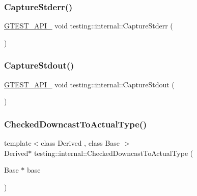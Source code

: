 \mbox{\label{namespacetesting_1_1internal_a8ec00d458d0d442bd64af7b5f9c22dda}} 
\subsubsection{\texorpdfstring{Capture\+Stderr()}{CaptureStderr()}}
{\footnotesize\ttfamily \hyperlink{gtest-port_8h_aa73be6f0ba4a7456180a94904ce17790}{G\+T\+E\+S\+T\+\_\+\+A\+P\+I\+\_\+} void testing\+::internal\+::\+Capture\+Stderr (\begin{DoxyParamCaption}{ }\end{DoxyParamCaption})}

\mbox{\label{namespacetesting_1_1internal_acba06d4f0343dec407738ba5544af990}} 
\subsubsection{\texorpdfstring{Capture\+Stdout()}{CaptureStdout()}}
{\footnotesize\ttfamily \hyperlink{gtest-port_8h_aa73be6f0ba4a7456180a94904ce17790}{G\+T\+E\+S\+T\+\_\+\+A\+P\+I\+\_\+} void testing\+::internal\+::\+Capture\+Stdout (\begin{DoxyParamCaption}{ }\end{DoxyParamCaption})}

\mbox{\label{namespacetesting_1_1internal_abfe9bfb020d38aa4e0e12c001911b22b}} 
\subsubsection{\texorpdfstring{Checked\+Downcast\+To\+Actual\+Type()}{CheckedDowncastToActualType()}}
{\footnotesize\ttfamily template$<$class Derived , class Base $>$ \\
Derived$\ast$ testing\+::internal\+::\+Checked\+Downcast\+To\+Actual\+Type (\begin{DoxyParamCaption}\item[{Base $\ast$}]{base }\end{DoxyParamCaption})}

